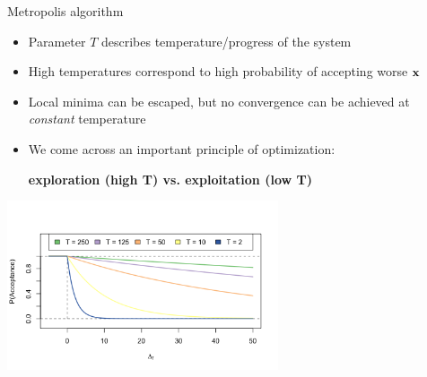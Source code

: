 \documentclass[11pt,compress,t,notes=noshow, xcolor=table]{beamer}
\begin{document}
\begin{vbframe}{Metropolis algorithm}
\begin{small}
    \begin{itemize}
        \item Parameter $T$ describes temperature/progress of the system
        \item High temperatures correspond to high probability of accepting worse $\mathbf{x}$
        \item Local minima can be escaped, but no convergence can be achieved at \textit{constant} temperature
        \item We come across an important principle of optimization:
            \vspace{-0.5\baselineskip}
            \begin{center}
                \textbf{exploration (high T) vs. exploitation (low T)}
            \end{center}
    \end{itemize}
\end{small}
\vspace{-0.3cm}
\begin{center}
\includegraphics[width=0.6\textwidth]{figure_man/metropolis-algorithm2.png}
\end{center}




\end{vbframe}
\end{document}
